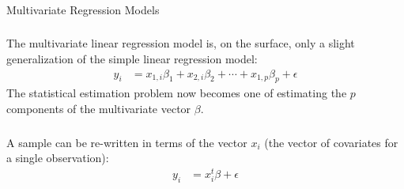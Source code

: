 \begin{frame}[fragile] \frametitle{}

\begin{flushright}
{\color{yaleblue}\sc\fontsize{1cm}{0cm}\selectfont Multivariate Regression Models}
\end{flushright}

\end{frame}

\begin{frame}[fragile] \frametitle{}

The multivariate linear regression model is, on the surface,
only a slight generalization of the simple linear regression model:
\begin{align*}
y_i &= x_{1,i} \beta_1 + x_{2,i} \beta_2 + \cdots + x_{1,p} \beta_p + \epsilon
\end{align*}
\pause The statistical estimation problem now becomes one of
estimating the $p$ components of the multivariate vector $\beta$.

\end{frame}


\begin{frame}[fragile] \frametitle{}

A sample can be re-written in terms of the vector $x_i$
(the vector of covariates for a single observation):
\begin{align*}
y_i &= x_{i}^t \beta + \epsilon
\end{align*}

\end{frame}

